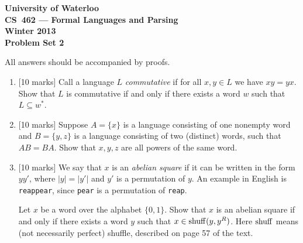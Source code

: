 \documentclass[12pt]{article}
\def\shuff{{\rm shuff}}
\begin{document}
\begin{center}
\large\bf University of Waterloo\\
CS~462 --- Formal Languages and Parsing\\
Winter 2013\\
Problem Set 2\\
\end{center}

\bigskip


\smallskip


\bigskip\bigskip

All answers should be accompanied by proofs.  

\begin{enumerate}

\item{} [10 marks]  
Call a language $L$ {\sl commutative} if for all $x, y \in L$
we have $xy = yx$.  Show that $L$ is commutative if and only if there exists
a word $w$ such that $L \subseteq w^*$.

\medskip

\item{} [10 marks]  
Suppose $A = \lbrace x \rbrace$ is a language consisting
of one nonempty word and $B = \lbrace y, z \rbrace$ is a language 
consisting of two (distinct) words, such that $AB = BA$.  Show that
$x, y, z$ are all powers of the same word.

\medskip

\item{} [10 marks]  
We say that $x$ is an {\it abelian square} if it can be written
in the form $y y'$, where $|y| = |y'|$ and $y'$ is a permutation
of $y$.  An example in English is {\tt reappear}, since
{\tt pear} is a permutation of {\tt reap}.

Let $x$ be a word over the alphabet $\lbrace 0,1 \rbrace$.
Show that $x$ is an abelian square
if and only if there exists a word $y$ such that
$x \in \shuff(y, y^R)$.  Here $\shuff$ means (not necessarily
perfect) shuffle, described on page 57 of the text.



\end{enumerate}
\end{document}
